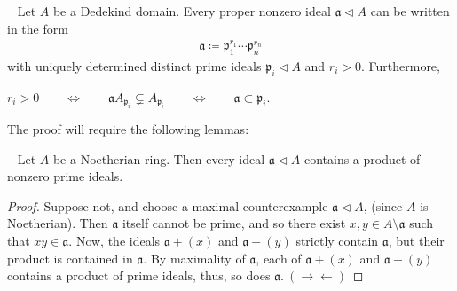 \documentclass[12pt,a4paper,footinclude=true,headinclude=true]{scrbook} %
\newenvironment{theorem}[2][]
{\renewcommand\theinnercustomthm{#2}\innercustomthm[#1]
\begin{mdframed}[backgroundcolor=yellow!20]\ }
{\end{mdframed}\endinnercustomthm}
\newenvironment{lemma}[2][]
{\renewcommand\theinnercustomlemma{#2}\innercustomlemma[#1]
\begin{mdframed}[backgroundcolor=gray!20]\ }
{\end{mdframed}\endinnercustomprop}
\begin{document}
\begin{theorem}{125}
    Let $A$ be a Dedekind domain. Every proper nonzero ideal $\mathfrak{a}
    \triangleleft A$ can be written in the form 
    \begin{align*}
        \mathfrak{a}\coloneqq 
        \mathfrak{p}_1^{r_1}\cdots\mathfrak{p}_n^{r_n}
    \end{align*}
    with uniquely determined distinct prime ideals $\mathfrak{p}_i\triangleleft A$ and $r_i>0$. Furthermore, \\ \centerline{$r_i>0\qquad\Leftrightarrow\qquad \mathfrak{a}A_{\mathfrak{p}_i}\subsetneq A_{\mathfrak{p}_i}\qquad\Leftrightarrow \qquad \mathfrak{a}\subset\mathfrak{p}_i$.}
\end{theorem}

The proof will require the following lemmas:

\begin{lemma}{126}
    Let $A$ be a Noetherian ring. Then every ideal $\mathfrak{a}\triangleleft A$ contains a product of nonzero prime ideals.
\end{lemma}
\begin{proof}
    Suppose not, and choose a maximal counterexample $\mathfrak{a} \triangleleft A$, (since $A$ is Noetherian). Then $\mathfrak{a}$ itself cannot be prime, and so there exist $x,y\in A\setminus \mathfrak{a}$ such that $xy\in\mathfrak{a}$. Now, the ideals $\mathfrak{a}+(x)$ and $\mathfrak{a}+(y)$ strictly contain $\mathfrak{a}$, but their product is contained in $\mathfrak{a}$. By maximality of $\mathfrak{a}$, each of $\mathfrak{a}+(x)$ and $\mathfrak{a}+(y)$ contains a product of prime ideals, thus, so does $\mathfrak{a}.\ (\to\gets)$
\end{proof}
\end{document}
